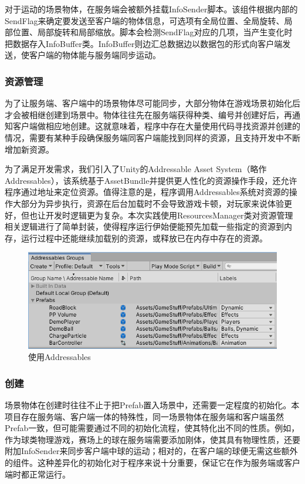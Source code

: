 \documentclass[conference]{IEEEtran}
\begin{document}
对于运动的场景物体，在服务端会被额外挂载InfoSender脚本。该组件根据内部的SendFlag来确定要发送至客户端的物体信息，可选项有全局位置、全局旋转、局部位置、局部旋转和局部缩放。脚本会检测SendFlag对应的几项，当产生变化时把数据存入InfoBuffer类。InfoBuffer则边汇总数据边以数据包的形式向客户端发送，使客户端的物体能与服务端同步运动。

\subsubsection{资源管理}
\quad

为了让服务端、客户端中的场景物体尽可能同步，大部分物体在游戏场景初始化后才会被相继创建到场景中。物体往往先在服务端获得种类、编号并创建好后，再通知客户端做相应地创建。这就意味着，程序中存在大量使用代码寻找资源并创建的情况，需要有某种手段确保服务端同客户端能找到同样的资源，且支持开发中不断增加新资源。

为了满足开发需求，我们引入了Unity的Addressable Asset System（略作Addressables）\cite{myCite:Dage}，该系统基于AssetBundle并提供更人性化的资源操作手段，还允许程序通过地址来定位资源。值得注意的是，程序调用Addressables系统对资源的操作大部分为异步执行，资源在后台加载时不会导致游戏卡顿，对玩家来说体验更好，但也让开发时逻辑更为复杂。本次实践使用ResourcesManager类对资源管理相关逻辑进行了简单封装，使得程序运行伊始便能预先加载一些指定的资源到内存，运行过程中还能继续加载别的资源，或释放已在内存中存在的资源。

\begin{figure}[htbp]
  \centerline{\includegraphics[width=.45\textwidth]{images/addressables.png}}
  \caption{使用Addressables}
  \label{fig:addressables}
\end{figure}

\subsubsection{创建}
\quad

场景物体在创建时往往不止于把Prefab置入场景中，还需要一定程度的初始化。本项目存在服务端、客户端一体的特殊性，同一场景物体在服务端和客户端虽然Prefab一致，但可能需要通过不同的初始化流程，使其特化出不同的性质。例如，作为球类物理游戏，赛场上的球在服务端需要添加刚体，使其具有物理性质，还要附加InfoSender来同步客户端中球的运动；相对的，在客户端的球便无需这些额外的组件。这种差异化的初始化对于程序来说十分重要，保证它在作为服务端或客户端时都正常运行。
\end{document}
